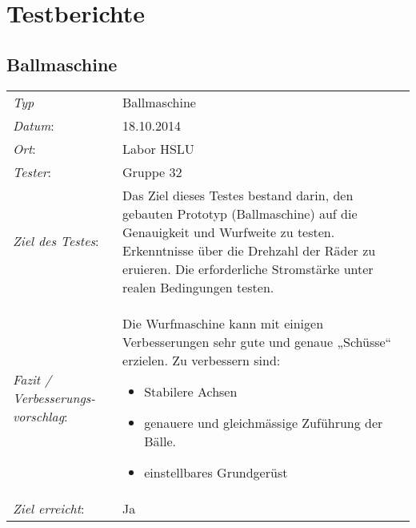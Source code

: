 \section{Testberichte}
\subsection{Ballmaschine}
\begin{tabular}{p{3.6cm}p{9.4cm}}
\textit{Typ}              & Ballmaschine \\ 
\textit{Datum}:           & 18.10.2014   \\
\textit{Ort}:             & Labor HSLU \\
\textit{Tester}:          & Gruppe 32 \\
\textit{Ziel des Testes}: & Das Ziel dieses Testes bestand darin, den gebauten Prototyp (Ballmaschine) auf die Genauigkeit und Wurfweite zu testen. Erkenntnisse über die Drehzahl der Räder zu eruieren. Die erforderliche Stromstärke unter realen Bedingungen testen.  \\
\textit{Fazit / Verbesserungs-\newline vorschlag}: & Die Wurfmaschine kann mit einigen Verbesserungen sehr gute und genaue „Schüsse“ erzielen. Zu verbessern sind:
\begin{itemize}
    \item Stabilere Achsen
    \item genauere und gleichmässige Zuführung der Bälle.
    \item einstellbares Grundgerüst
\end{itemize}\\
\textit{Ziel erreicht}:& Ja\\
\end{tabular}
